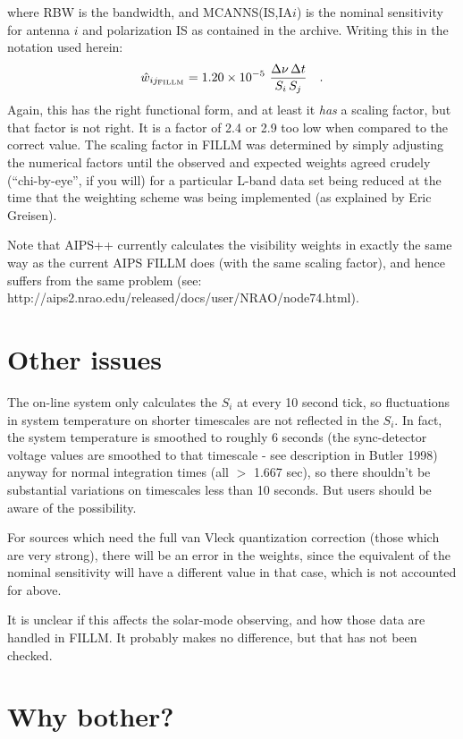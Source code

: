 \documentclass[11pt]{article}
\begin{document}
\noindent
where RBW is the bandwidth, and MCANNS(IS,IA$i$) is the nominal
sensitivity for antenna $i$ and polarization IS as contained in the
archive.  Writing this in the notation used herein:
\begin{equation}
   \hat{w}_{ij_{\rm FILLM}} = 1.20 \times 10^{-5} \
                     \dfrac{\Delta\nu \, \Delta{t}}{S_i \, S_j}  \quad .
\end{equation}
Again, this has the right functional form, and at least it {\it has} a
scaling factor, but that factor is not right.  It is a factor of 2.4 or
2.9 too low when compared to the correct value.  The scaling factor in
FILLM was determined by simply adjusting the numerical factors until the
observed and expected weights agreed crudely (``chi-by-eye'', if you
will) for a particular L-band data set being reduced at the time that
the weighting scheme was being implemented (as explained by Eric
Greisen).

Note that AIPS++ currently calculates the visibility weights in exactly
the same way as the current AIPS FILLM does (with the same scaling
factor), and hence suffers from the same problem (see:
http://aips2.nrao.edu/released/docs/user/NRAO/node74.html).

\section{Other issues}

The on-line system only calculates the $S_i$ at every 10 second tick,
so fluctuations in system temperature on shorter timescales are not
reflected in the $S_i$.  In fact, the system temperature is smoothed
to roughly 6 seconds (the sync-detector voltage values are smoothed to
that timescale - see description in Butler 1998) anyway for normal
integration times (all $>$ 1.667 sec), so there shouldn't be substantial
variations on timescales less than 10 seconds.  But users should be
aware of the possibility.

For sources which need the full van Vleck quantization correction (those
which are very strong), there will be an error in the weights, since the
equivalent of the nominal sensitivity will have a different value in
that case, which is not accounted for above.

It is unclear if this affects the solar-mode observing, and how those
data are handled in FILLM.  It probably makes no difference, but that
has not been checked.

\section{Why bother?}
\end{document}
